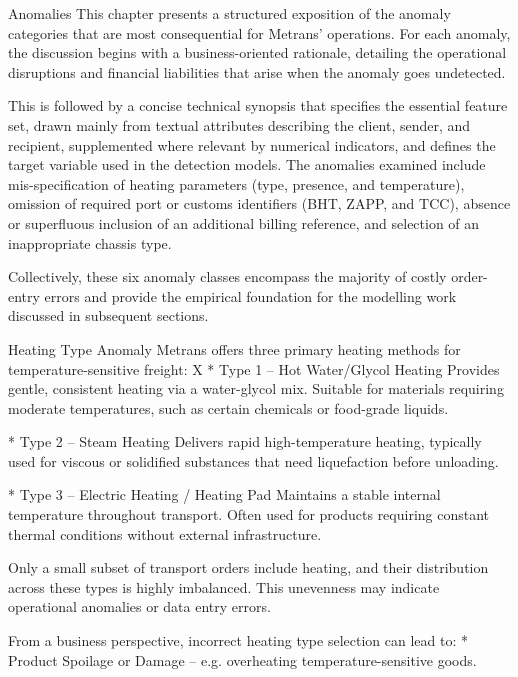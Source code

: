 \chap Anomalies
This chapter presents a structured exposition of the anomaly categories that are most consequential for Metrans’ operations. For each anomaly, the discussion begins with a business-oriented rationale, detailing the operational disruptions and financial liabilities that arise when the anomaly goes undetected.

This is followed by a concise technical synopsis that specifies the essential feature set, drawn mainly from textual attributes describing the client, sender, and recipient, supplemented where relevant by numerical indicators, and defines the target variable used in the detection models. The anomalies examined include mis-specification of heating parameters (type, presence, and temperature), omission of required port or customs identifiers (BHT, ZAPP, and TCC), absence or superfluous inclusion of an additional billing reference, and selection of an inappropriate chassis type. 

Collectively, these six anomaly classes encompass the majority of costly order-entry errors and provide the empirical foundation for the modelling work discussed in subsequent sections.

 
\sec Heating Type Anomaly
Metrans offers three primary heating methods for temperature-sensitive freight:
\begitems \style X
 * Type 1 – Hot Water/Glycol Heating
Provides gentle, consistent heating via a water-glycol mix. Suitable for materials requiring moderate temperatures, such as certain chemicals or food-grade liquids.

* Type 2 – Steam Heating
Delivers rapid high-temperature heating, typically used for viscous or solidified substances that need liquefaction before unloading.

* Type 3 – Electric Heating / Heating Pad
Maintains a stable internal temperature throughout transport. Often used for products requiring constant thermal conditions without external infrastructure.
\enditems

Only a small subset of transport orders include heating, and their distribution across these types is highly imbalanced. This unevenness may indicate operational anomalies or data entry errors.

From a business perspective, incorrect heating type selection can lead to:
\begitems
* Product Spoilage or Damage – e.g. overheating temperature-sensitive goods.

